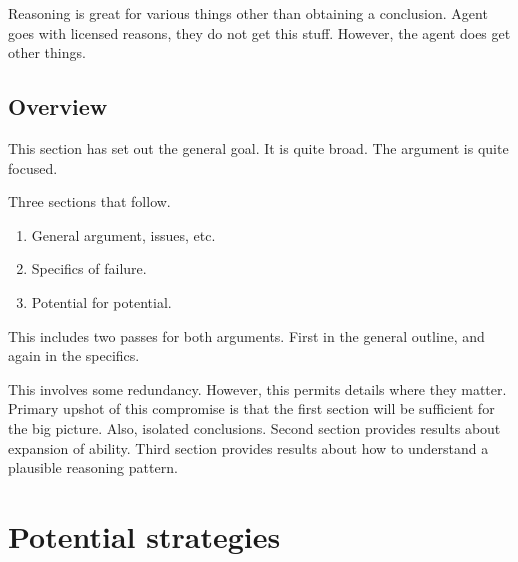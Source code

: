 \documentclass[10pt]{article}
\newcommand{\hozlinedash}[0]{%
  \noindent\hdashrule[0.5ex][c]{\textwidth}{.1pt}{2.5pt}
}
\begin{document}
Reasoning is great for various things other than obtaining a conclusion.
Agent goes with licensed reasons, they do not get this stuff.
However, the agent does get other things.

\subsection{Overview}
\label{sec:overview}

This section has set out the general goal.
It is quite broad.
The argument is quite focused.

Three sections that follow.
\begin{enumerate}
\item General argument, issues, etc.
\item Specifics of failure.
\item Potential for potential.
\end{enumerate}
This includes two passes for both arguments.
First in the general outline, and again in the specifics.

This involves some redundancy.
However, this permits details where they matter.
Primary upshot of this compromise is that the first section will be sufficient for the big picture.
Also, isolated conclusions.
Second section provides results about expansion of ability.
Third section provides results about how to understand a plausible reasoning pattern.

\hozlinedash

\section{Potential strategies}
\label{sec:potential-strategies}
\end{document}
